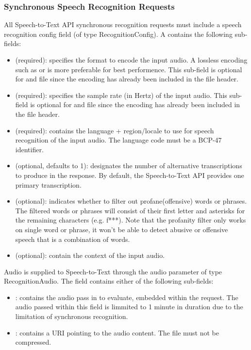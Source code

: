 \subsubsection{Synchronous Speech Recognition Requests}
All Speech-to-Text API synchronous recognition requests must include a speech recognition config field (of type RecognitionConfig). A  contains the following sub-fields:
\begin{itemize}
    \item {} (required): specifies the format to encode the input audio. A lossless encoding such as  or  is more preferable for best performence. This sub-field is optional for  and  file since the encoding has already been included in the file header.
    \item {} (required): specifies the sample rate (in Hertz) of the input audio. This sub-field is optional for  and  file since the encoding has already been included in the file header.
    \item {} (required): contains the language + region/locale to use for speech recognition of the input audio. The language code must be a BCP-47 \cite{BCP47} identifier. 
    \item {} (optional, defaults to 1): designates the number of alternative transcriptions to produce in the response. By default, the Speech-to-Text API provides one primary transcription. 
    \item {} (optional): indicates whether to filter out profane(offensive) words or phrases. The filtered words or phrases will consist of their first letter and asterisks for the remaining characters (e.g. f***). Note that the profanity filter only works on single word or phrase, it won't be able to detect abusive or offensive speech that is a combination of words.
    \item {} (optional): contain the context of the input audio.
\end{itemize}
\indent Audio is supplied to Speech-to-Text through the audio parameter of type RecognitionAudio. The  field contains either of the following sub-fields:
\begin{itemize}
    \item {}: contains the audio pass in to evaluate, embedded within the request. The audio passed within this field is limmited to 1 minute in duration due to the limitation of synchronous recognition.
    \item {}: contains a URI pointing to the audio content. The file must not be compressed.
\end{itemize}
